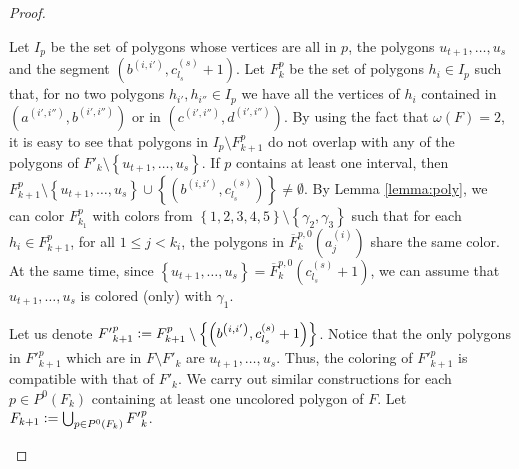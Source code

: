 \documentclass[12pt]{article}
\theoremstyle{definition}
\newcommand{\defeq}{\vcentcolon=}
\begin{document}
\begin{proof}
\begin{itemize}
                 Let $I_{p}$ be the set of polygons
                 whose vertices are all
                 in $p$, the polygons
                 $u_{t+1}, \ldots, u_{s}$ and 
                 the segment $\left(b^{\left(i, i'\right)},
                 c_{l_{s}}^{\left(s\right)} + 1\right)$.
                 Let $F_{k}^{p}$ be the set of
                 polygons $h_{i} \in I_{p}$ 
                 such that, for no two polygons
                 $h_{i'}, h_{i''} \in I_{p}$
                 we have all the vertices
                 of $h_{i}$ contained in
                 $\left(a^{\left(i', i''\right)},
                 b^{\left(i', i''\right)}\right)$ 
                 or in
                 $\left(c^{\left(i',i''\right)}, 
                 d^{\left(i',i''\right)}\right)$.
                 By using the fact
                 that $\omega\left(F\right) = 2$,
                 it is easy to see that 
                 polygons in $I_{p} \setminus F_{k+1}^{p}$ 
                 do not overlap with 
                 any of the polygons of
                 $F'_{k} \setminus \left\{u_{t+1}, \ldots
                 , u_{s}\right\}$.
                 If $p$ contains at least
                 one interval, 
                 then 
                 $F_{k+1}^{p} 
                 \setminus 
                 \left\{u_{t+1}, \ldots, u_{s}\right\}
                 \cup 
                 \left\{\left(
                 b^{\left(i, i'\right)},
                 c_{l_{s}}^{\left(s\right)}\right)\right\}
                 \neq \emptyset$.
                 By Lemma \ref{lemma:poly},
                 we can color $F_{k_1}^{p}$ with
                 colors from 
                 $\left\{1, 2, 3, 4, 5\right\} \setminus 
                 \left\{\gamma_2, \gamma_3\right\}$
                 such that for each $h_{i} \in F_{k+1}^{p}$,
                 for all
                 $1 \leq j < k_{i}$, the polygons in
                 $\overline{F}_{k}^{p, 0}\left(a_{j}^{\left(i\right)}\right)$ 
                 share the same color. At the same time,
                 since $\left\{u_{t +1}, \ldots, u_{s}\right\} = 
                 \overline{F}_{k}^{p, 0}\left(c_{l_{s}}^{\left(s\right)} + 1\right)$,
                 we can assume that $u_{t + 1}, \ldots, u_{s}$ 
                 is colored (only) with $\gamma_1$.

                 Let us denote ${F'}_{k+1}^{p} \defeq
                 F_{k+1}^{p} \setminus \left\{\left(
                 b^{\left(i, i'\right)},
                 c_{l_{s}}^{\left(s\right)} + 1\right)\right\}$.
                 Notice that the only
                 polygons in ${F'}_{k+1}^{p}$ 
                 which are in $F \setminus F'_{k}$ 
                 are $u_{t + 1}, \ldots, u_{s}$.
                 Thus, the coloring of
                 ${F'}_{k+1}^{p}$ is compatible with that 
                 of $F'_{k}$. We carry out similar 
                 constructions for each 
                 $p \in P^{0}\left(F_{k}\right)$ 
                 containing at least one uncolored
                 polygon of $F$. Let 
                 $F_{k+1} \defeq \bigcup_{p \in P^{0}\left(F_{k}\right)}
                 {F'}_{k}^{p}$.


\end{itemize}
\end{proof}
\end{document}
